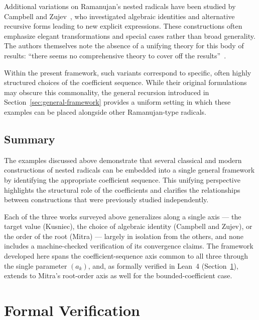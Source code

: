 \documentclass[11pt,a4paper]{amsart}
\theoremstyle{plain}
\theoremstyle{definition}
\theoremstyle{remark}
\begin{document}
Additional variations on Ramanujan’s nested radicals have been studied by Campbell and Zujev~\cite{CampbellZujevRadicals}, who investigated algebraic identities and alternative recursive forms leading to new explicit expressions. These constructions often emphasize elegant transformations and special cases rather than broad generality. The authors themselves note the absence of a unifying theory for this body of results: \enquote{there seems no comprehensive theory to cover off the results}~\cite{CampbellZujevRadicals}.

Within the present framework, such variants correspond to specific, often highly structured choices of the coefficient sequence. While their original formulations may obscure this commonality, the general recursion introduced in Section~\ref{sec:general-framework} provides a uniform setting in which these examples can be placed alongside other Ramanujan-type radicals.

\subsection{Summary}

The examples discussed above demonstrate that several classical and modern constructions of nested radicals can be embedded into a single general framework by identifying the appropriate coefficient sequence. This unifying perspective highlights the structural role of the coefficients and clarifies the relationships between constructions that were previously studied independently.

Each of the three works surveyed above generalizes along a single axis — the target value (Kusniec), the choice of algebraic identity (Campbell and Zujev), or the order of the root (Mitra) — largely in isolation from the others, and none includes a machine-checked verification of its convergence claims. The framework developed here spans the coefficient-sequence axis common to all three through the single parameter $(a_k)$, and, as formally verified in Lean~4 (Section~\ref{sec:formal-verification}), extends to Mitra's root-order axis as well for the bounded-coefficient case.



\section{Formal Verification}
\label{sec:formal-verification}
\end{document}
